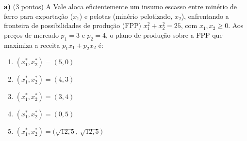 \textbf{a)} (3 pontos) A Vale aloca eficientemente um insumo escasso entre minério de ferro para exportação ($x_1$) e pelotas (minério pelotizado, $x_2$), enfrentando a fronteira de possibilidades de produção (FPP) $x_1^2 + x_2^2 = 25$, com $x_1,x_2\ge 0$. Aos preços de mercado $p_1 = 3$ e $p_2 = 4$, o plano de produção sobre a FPP que maximiza a receita $p_1 x_1 + p_2 x_2$ é:

\begin{enumerate}[label=\Alph*., leftmargin=3.2em, itemsep=0.05em, topsep=0.1em]
  \item $(x_1^{*},x_2^{*}) = (5,0)$
  \item $(x_1^{*},x_2^{*}) = (4,3)$
  \item $(x_1^{*},x_2^{*}) = (3,4)$
  \item $(x_1^{*},x_2^{*}) = (0,5)$
  \item $(x_1^{*},x_2^{*}) = \big(\sqrt{12{,}5},\,\sqrt{12{,}5}\big)$
\end{enumerate}
